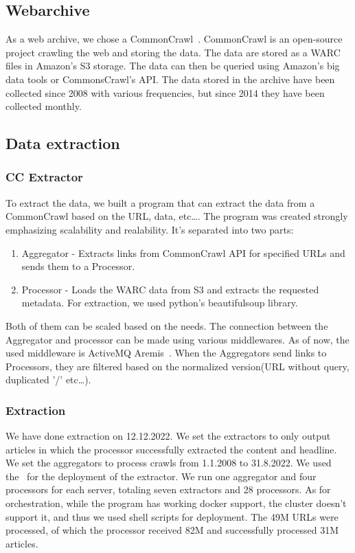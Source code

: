 \begin{itemize}
\subsection{Webarchive}
As a web archive, we chose a CommonCrawl~\cite{CommonCrawl}. 
CommonCrawl is an open-source project crawling the web and storing the data. 
The data are stored as a WARC files in Amazon's S3 storage.
 The data can then be queried using Amazon's big data tools or CommonsCrawl's API.
The data stored in the archive have been collected since 2008 with various frequencies,
but since 2014 they have been collected monthly.

\subsection{Data extraction}
\subsubsection{CC Extractor}
To extract the data, we built a program that can extract the data from a CommonCrawl
 based on the URL, data, etc\dots. The program was 
created strongly emphasizing scalability and realability.
It's separated into two parts:
\begin{enumerate}
    \item Aggregator - 
    Extracts links from CommonCrawl API for specified URLs and sends them to a Processor.
    \item Processor - 
    Loads the WARC data from S3 and extracts the requested metadata.
    For extraction, we used python's beautifulsoup library.
\end{enumerate}
Both of them can be scaled based on the needs.
The connection between the Aggregator and processor can be made using various middlewares.
As of now, the used middleware is ActiveMQ Aremis~\cite{ActiveMQ}.
When the Aggregators send links to Processors,
they are filtered based on the normalized version(URL without query, duplicated '/' etc\dots).
\subsubsection{Extraction}
We have done extraction on 12.12.2022.
We set the extractors to only output articles in which the processor successfully
extracted the content and headline.
We set the aggregators to process crawls from 1.1.2008 to 31.8.2022.
We used the~\cite{UFALAIC} for the deployment of the extractor. 
We run one aggregator and four processors for each server,
totaling seven extractors and 28 processors.
As for orchestration, while the program has working docker support,
the cluster doesn't support it, and thus we used shell scripts for deployment.
The 49M URLs were processed, of which the processor received 82M
and successfully processed 31M articles.


\end{itemize}
